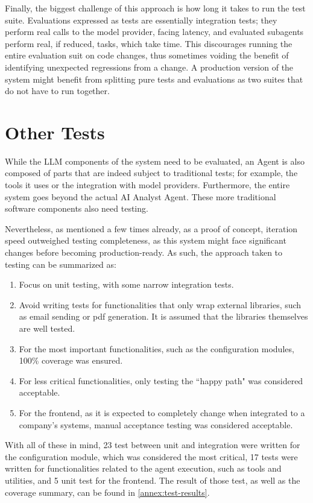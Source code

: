 \documentclass[a4paper]{report}
\begin{document}
Finally, the biggest challenge of this approach is how long it takes to run the test suite. Evaluations expressed as tests are essentially integration tests; they perform real calls to the model provider, facing latency, and evaluated subagents perform real, if reduced, tasks, which take time. This discourages running the entire evaluation suit on code changes, thus sometimes voiding the benefit of identifying unexpected regressions from a change. A production version of the system might benefit from splitting pure tests and evaluations as two suites that do not have to run together.

\section{Other Tests}
\label{sec:other-tests}

While the LLM components of the system need to be evaluated, an Agent is also composed of parts that are indeed subject to traditional tests; for example, the tools it uses or the integration with model providers. Furthermore, the entire system goes beyond the actual AI Analyst Agent. These more traditional software components also need testing.

Nevertheless, as mentioned a few times already, as a proof of concept, iteration speed outweighed testing completeness, as this system might face significant changes before becoming production-ready. As such, the approach taken to testing can be summarized as:

\begin{enumerate}
    \item Focus on unit testing, with some narrow integration tests.
    \item Avoid writing tests for functionalities that only wrap external libraries, such as email sending or pdf generation. It is assumed that the libraries themselves are well tested.
    \item For the most important functionalities, such as the configuration modules, 100\% coverage was ensured.
    \item For less critical functionalities, only testing the ``happy path" was considered acceptable.
    \item For the frontend, as it is expected to completely change when integrated to a company's systems, manual acceptance testing was considered acceptable.
\end{enumerate}

With all of these in mind, 23 test between unit and integration were written for the configuration module, which was considered the most critical, 17 tests were written for functionalities related to the agent execution, such as tools and utilities, and 5 unit test for the frontend. The result of those test, as well as the coverage summary, can be found in \autoref{annex:test-results}.
\end{document}
